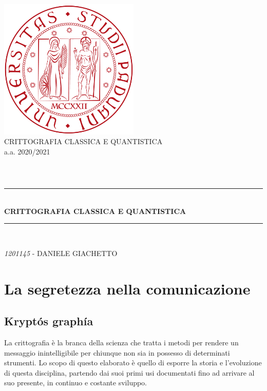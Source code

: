 \documentclass[a4paper, 12pt]{article}
\newcommand{\TITLE}{CRITTOGRAFIA CLASSICA E QUANTISTICA}
\begin{document}
\begin{titlepage}
\begin{center}
\includegraphics[width=0.5\textwidth]{unipd.png}\\

{\large \TITLE{} \\ a.a. 2020/2021}\\[0.5cm]

\begin{tabular}{ll}

\end{tabular}
\\[1.cm]

\rule{\linewidth}{0.5mm} \\[0.4cm]
{ \huge \bfseries \TITLE{} \\[0.4cm] } %

\rule{\linewidth}{0.5mm} \\[1.cm]
\noindent

\vfill
{\large \textit{1201145} - DANIELE GIACHETTO} %
\end{center}
\end{titlepage}

\tableofcontents %
\clearpage %

\pagestyle{fancy}
\section{La segretezza nella comunicazione}
\subsection{Kryptós graphía}
La crittografia è la branca della scienza che tratta i metodi per rendere un messaggio inintelligibile per chiunque non sia in possesso di determinati strumenti.\newline
Lo scopo di questo elaborato è quello di esporre la storia e l'evoluzione di questa disciplina, partendo dai suoi primi usi documentati fino ad arrivare al suo presente, in continuo e costante sviluppo.
\end{document}
